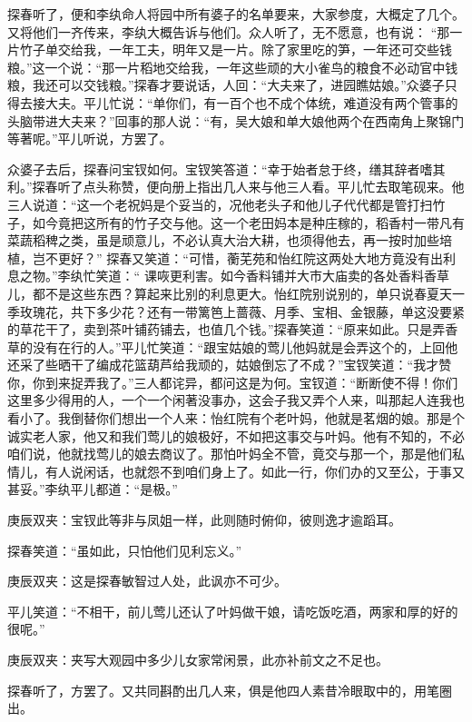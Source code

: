 \begin{parag}
    探春听了，便和李纨命人将园中所有婆子的名单要来，大家参度，大概定了几个。又将他们一齐传来，李纨大概告诉与他们。众人听了，无不愿意，也有说： “那一片竹子单交给我，一年工夫，明年又是一片。除了家里吃的笋，一年还可交些钱粮。”这一个说：“那一片稻地交给我，一年这些顽的大小雀鸟的粮食不必动官中钱粮，我还可以交钱粮。”探春才要说话，人回：“大夫来了，进园瞧姑娘。”众婆子只得去接大夫。平儿忙说：“单你们，有一百个也不成个体统，难道没有两个管事的头脑带进大夫来？”回事的那人说：“有，吴大娘和单大娘他两个在西南角上聚锦门等著呢。”平儿听说，方罢了。
\end{parag}


\begin{parag}
    众婆子去后，探春问宝钗如何。宝钗笑答道：“幸于始者怠于终，缮其辞者嗜其利。”探春听了点头称赞，便向册上指出几人来与他三人看。平儿忙去取笔砚来。他三人说道：“这一个老祝妈是个妥当的，况他老头子和他儿子代代都是管打扫竹子，如今竟把这所有的竹子交与他。这一个老田妈本是种庄稼的，稻香村一带凡有菜蔬稻稗之类，虽是顽意儿，不必认真大治大耕，也须得他去，再一按时加些培植，岂不更好？” 探春又笑道：“可惜，蘅芜苑和怡红院这两处大地方竟没有出利息之物。”李纨忙笑道：“ 课咴更利害。如今香料铺并大市大庙卖的各处香料香草儿，都不是这些东西？算起来比别的利息更大。怡红院别说别的，单只说春夏天一季玫瑰花，共下多少花？还有一带篱笆上蔷薇、月季、宝相、金银藤，单这没要紧的草花干了，卖到茶叶铺药铺去，也值几个钱。”探春笑道：“原来如此。只是弄香草的没有在行的人。”平儿忙笑道：“跟宝姑娘的莺儿他妈就是会弄这个的，上回他还采了些晒干了编成花篮葫芦给我顽的，姑娘倒忘了不成？”宝钗笑道：“我才赞你，你到来捉弄我了。”三人都诧异，都问这是为何。宝钗道：“断断使不得！你们这里多少得用的人，一个一个闲著没事办，这会子我又弄个人来，叫那起人连我也看小了。我倒替你们想出一个人来：怡红院有个老叶妈，他就是茗烟的娘。那是个诚实老人家，他又和我们莺儿的娘极好，不如把这事交与叶妈。他有不知的，不必咱们说，他就找莺儿的娘去商议了。那怕叶妈全不管，竟交与那一个，那是他们私情儿，有人说闲话，也就怨不到咱们身上了。如此一行，你们办的又至公，于事又甚妥。”李纨平儿都道：“是极。”\begin{note}庚辰双夹：宝钗此等非与凤姐一样，此则随时俯仰，彼则逸才逾蹈耳。\end{note}探春笑道：“虽如此，只怕他们见利忘义。”\begin{note}庚辰双夹：这是探春敏智过人处，此讽亦不可少。\end{note}平儿笑道：“不相干，前儿莺儿还认了叶妈做干娘，请吃饭吃酒，两家和厚的好的很呢。”\begin{note}庚辰双夹：夹写大观园中多少儿女家常闲景，此亦补前文之不足也。\end{note}探春听了，方罢了。又共同斟酌出几人来，俱是他四人素昔冷眼取中的，用笔圈出。
\end{parag}


